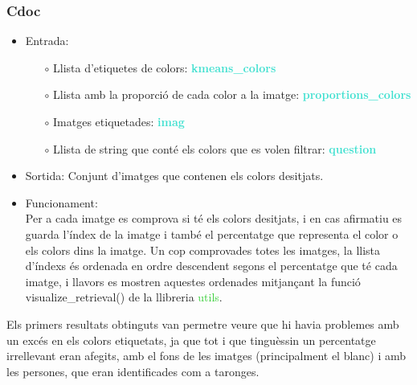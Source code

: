 \documentclass[a4paper, 11pt]{article}
\begin{document}
\subsubsection{Cdoc}
\begin{itemize}
    \item Entrada: 
    \begin{itemize}
        \item[$\circ$] Llista d'etiquetes de colors: \textbf{\textcolor{Turquoise}{kmeans\_colors}}
        \item[$\circ$] Llista amb la proporció de cada color a la imatge: \textbf{\textcolor{Turquoise}{proportions\_colors}}
        \item[$\circ$] Imatges etiquetades: \textbf{\textcolor{Turquoise}{imag}}
        \item[$\circ$] Llista de string que conté els colors que es volen filtrar: \textbf{\textcolor{Turquoise}{question}}
    \end{itemize}
    \item Sortida: Conjunt d'imatges que contenen els colors desitjats.
    \item Funcionament: \\
    Per a cada imatge es comprova si té els colors desitjats, i en cas afirmatiu es guarda l'índex de la imatge i també el percentatge que representa el color o els colors dins la imatge. Un cop comprovades totes les imatges, la llista d'índexs és ordenada en ordre descendent segons el percentatge que té cada imatge, i llavors es mostren aquestes ordenades mitjançant la funció \textcolor{funcblue}{visualize\_retrieval()} de la llibreria \textcolor{LimeGreen}{utils}.
\end{itemize}
Els primers resultats obtinguts van permetre veure que hi havia problemes amb un excés en els colors etiquetats, ja que tot i que tinguèssin un percentatge irrellevant eran afegits, amb el fons de les imatges (principalment el blanc) i amb les persones, que eran identificades com a taronges.
\end{document}
